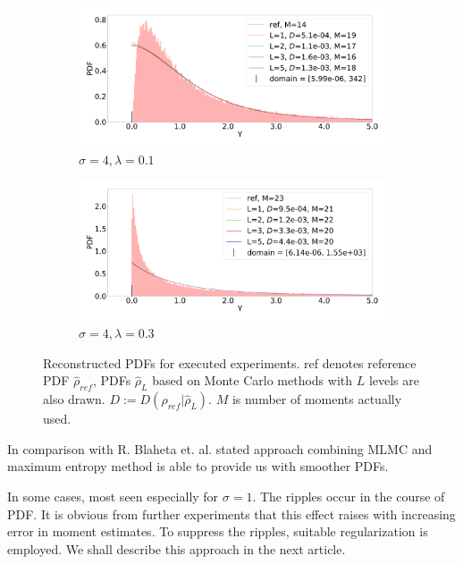 \documentclass{article}
\begin{document}
\begin{figure}[!htp]
\ContinuedFloat
\begin{subfigure}{0.5\textwidth}
  \includegraphics[width=\linewidth]{porous_media_flow/MLMC/cl_0_1_s_4.pdf}
  \caption{$\sigma = 4, \lambda=0.1$}
  \label{fig:cl_0_1_s_4}
\end{subfigure}\hfil
\begin{subfigure}{0.5\textwidth}
  \includegraphics[width=\linewidth]{porous_media_flow/MLMC/cl_0_3_s_4.pdf}
  \caption{$\sigma = 4, \lambda=0.3$}
  \label{fig:cl_0_3_s_4}
\end{subfigure}
\caption{Reconstructed PDFs for executed experiments. ref denotes reference PDF $\hat{\rho}_{ref}$, PDFs $\hat{\rho}_{L}$ based on Monte Carlo methods with $L$ levels are also drawn.  $D:=D(\hat{\rho}_{ref}|\hat{\rho}_{L})$. $M$ is number of moments actually used.}
\label{fig:flow_distrs}
\end{figure}
\FloatBarrier

In comparison with R. Blaheta et. al. \cite[Figure 8]{Blaheta20160413} stated approach combining MLMC and maximum entropy method is able to provide us with smoother PDFs.


In some cases, most seen especially for $\sigma=1$. The ripples occur in the course of PDF. It is obvious from further experiments that this effect raises with increasing error in moment estimates. To suppress the ripples, suitable regularization is employed. We shall describe this approach in the next article.
\end{document}
